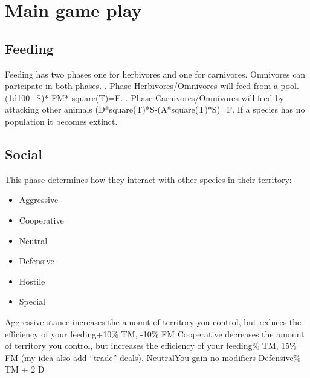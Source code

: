 \chapter{Main game play}
\label{ch:gameplay}

\section{Feeding}
\label{sec:gameplay:Feeding}

Feeding has two phases one for herbivores and one for carnivores.\newline
Omnivores can partcipate in both phases.\newline
{}. Phase\newline
\newline
Herbivores/Omnivores will feed from a pool.\newline
(1d100+\ac{S})* \ac{FM}* square(\ac{T})=\ac{F}.\newline
{}. Phase\newline
\newline
Carnivores/Omnivores will feed by attacking other animals\newline
(\ac{D}*square(\ac{T})*\ac{S}-(\ac{A}*square(\ac{T})*\ac{S})=\ac{F}.\newline
\newline
If a species has no population it becomes extinct.

\section{Social}
\label{sec:gameplay:Social}

This phase determines how they interact with other species in their territory:
\begin{itemize}
	\item Aggressive
	\item Cooperative
	\item Neutral 
	\item Defensive
	\item Hostile
	\item Special
\end{itemize}
Aggressive stance increases the amount of territory you control, but reduces the efficiency of your feeding\newline +10\% \ac{TM}, -10\% \ac{FM}\newline\newline
Cooperative decreases the amount of territory you control, but increases the efficiency of your feeding\% \ac{TM}, 15\% \ac{FM} (my idea also add "`trade"' deals).\newline\newline
Neutral\newline You gain no modifiers\newline\newline
Defensive\% \ac{TM} + 2 \ac{D}\newline\newline

